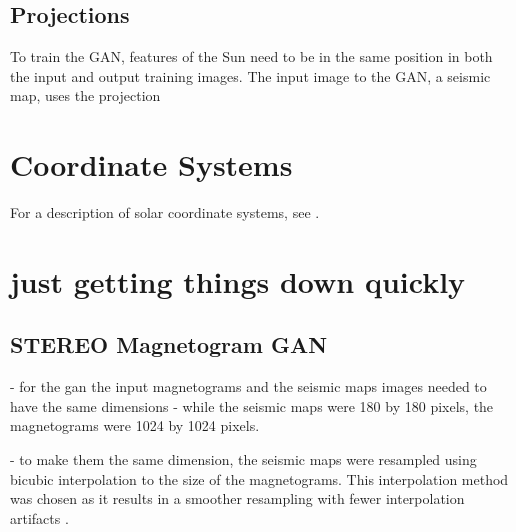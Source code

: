 \documentclass[11pt,a4paper,onecolumn]{report}
\begin{document}
\section{Projections}
To train the GAN, features of the Sun need to be in the same position in both
the input and output training images.
The input image to the GAN, a seismic map, uses the projection







\appendix

\chapter{Coordinate Systems}
For a description of solar coordinate systems, see \citet{thompson_w_t_coordinate_2006}.


\chapter{just getting things down quickly}



\section{STEREO Magnetogram GAN}
- for the gan the input magnetograms and the seismic maps images needed to have
the same dimensions
- while the seismic maps were 180 by 180 pixels, the magnetograms were 1024 by
1024 pixels.




- to make them the same dimension, the seismic maps were resampled using bicubic
interpolation to the size of the magnetograms. This interpolation method was
chosen as it results in a smoother resampling with fewer interpolation artifacts
\citep{keys_cubic_1981}.

 
\end{document}
